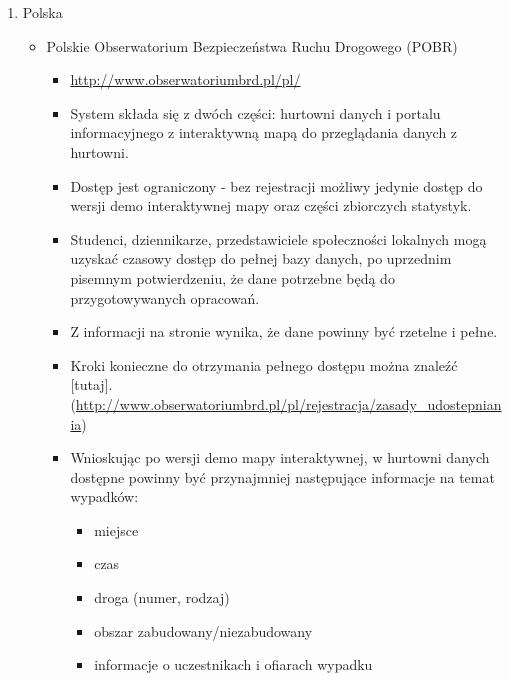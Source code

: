 \begin{enumerate}
\item
  Polska

  \begin{itemize}
  \item
    Polskie Obserwatorium Bezpieczeństwa Ruchu Drogowego (POBR)

    \begin{itemize}
    \item
      \url{http://www.obserwatoriumbrd.pl/pl/}\\
    \item
      System składa się z dwóch części: hurtowni danych i portalu
      informacyjnego z interaktywną mapą do przeglądania danych z
      hurtowni.\\
    \item
      Dostęp jest ograniczony - bez rejestracji możliwy jedynie dostęp
      do wersji demo interaktywnej mapy oraz części zbiorczych
      statystyk.\\
    \item
      Studenci, dziennikarze, przedstawiciele społeczności lokalnych
      mogą uzyskać czasowy dostęp do pełnej bazy danych, po uprzednim
      pisemnym potwierdzeniu, że dane potrzebne będą do przygotowywanych
      opracowań.\\
    \item
      Z informacji na stronie wynika, że dane powinny być rzetelne i
      pełne.\\
    \item
      Kroki konieczne do otrzymania pełnego dostępu można znaleźć
      {[}tutaj{]}.(\url{http://www.obserwatoriumbrd.pl/pl/rejestracja/zasady_udostepniania})\\
    \item
      Wnioskując po wersji demo mapy interaktywnej, w hurtowni danych
      dostępne powinny być przynajmniej następujące informacje na temat
      wypadków:

      \begin{itemize}
      \item
        miejsce\\
      \item
        czas\\
      \item
        droga (numer, rodzaj)\\
      \item
        obszar zabudowany/niezabudowany\\
      \item
        informacje o uczestnikach i ofiarach wypadku


\end{itemize}
\end{itemize}
\end{itemize}
\end{enumerate}
